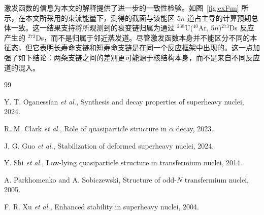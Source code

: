 \documentclass[12pt,a4paper]{ctexart}
\begin{document}
激发函数的信息为本文的解释提供了进一步的一致性检验。如图~\ref{fig:exFun} 所示，在本文所采用的束流能量下，测得的截面与该能区 $5n$ 道占主导的计算预期总体一致。这一结果支持将所观测到的衰变链归属为通过 $^{238}$U($^{40}$Ar, $5n$)$^{273}$Ds 反应产生的 $^{273}$Ds，而不是归属于邻近蒸发道。尽管激发函数本身并不能区分不同的本征态，但它表明长寿命支链和短寿命支链是在同一个反应框架中出现的。这一点加强了如下结论：两条支链之间的差别更可能源于核结构本身，而不是来自不同反应道的混入。

\begin{thebibliography}{99}

Y. T. Oganessian \textit{et al.},
Synthesis and decay properties of superheavy nuclei,
2024.

R. M. Clark \textit{et al.},
Role of quasiparticle structure in $\alpha$ decay,
2023.

J. G. Guo \textit{et al.},
Stabilization of deformed superheavy nuclei,
2024.

Y. Shi \textit{et al.},
Low-lying quasiparticle structure in transfermium nuclei,
2014.

A. Parkhomenko and A. Sobiczewski,
Structure of odd-$N$ transfermium nuclei,
2005.

F. R. Xu \textit{et al.},
Enhanced stability in superheavy nuclei,
2004.

\end{thebibliography}
\end{document}
